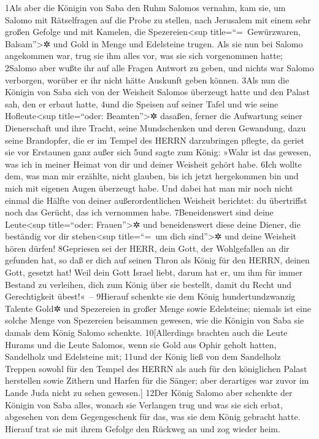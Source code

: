 1Als aber die Königin von Saba den Ruhm Salomos vernahm, kam sie, um
Salomo mit Rätselfragen auf die Probe zu stellen, nach Jerusalem mit
einem sehr großen Gefolge und mit Kamelen, die Spezereien\textless sup
title=``=~Gewürzwaren, Balsam''\textgreater✲ und Gold in Menge und
Edelsteine trugen. Als sie nun bei Salomo angekommen war, trug sie ihm
alles vor, was sie sich vorgenommen hatte; 2Salomo aber wußte ihr auf
alle Fragen Antwort zu geben, und nichts war Salomo verborgen, worüber
er ihr nicht hätte Auskunft geben können. 3Als nun die Königin von Saba
sich von der Weisheit Salomos überzeugt hatte und den Palast sah, den er
erbaut hatte, 4und die Speisen auf seiner Tafel und wie seine
Hofleute\textless sup title=``oder: Beamten''\textgreater✲ dasaßen,
ferner die Aufwartung seiner Dienerschaft und ihre Tracht, seine
Mundschenken und deren Gewandung, dazu seine Brandopfer, die er im
Tempel des HERRN darzubringen pflegte, da geriet sie vor Erstaunen ganz
außer sich 5und sagte zum König: »Wahr ist das gewesen, was ich in
meiner Heimat von dir und deiner Weisheit gehört habe. 6Ich wollte dem,
was man mir erzählte, nicht glauben, bis ich jetzt hergekommen bin und
mich mit eigenen Augen überzeugt habe. Und dabei hat man mir noch nicht
einmal die Hälfte von deiner außerordentlichen Weisheit berichtet: du
übertriffst noch das Gerücht, das ich vernommen habe. 7Beneidenswert
sind deine Leute\textless sup title=``oder: Frauen''\textgreater✲ und
beneidenswert diese deine Diener, die beständig vor dir
stehen\textless sup title=``=~um dich sind''\textgreater✲ und deine
Weisheit hören dürfen! 8Gepriesen sei der HERR, dein Gott, der
Wohlgefallen an dir gefunden hat, so daß er dich auf seinen Thron als
König für den HERRN, deinen Gott, gesetzt hat! Weil dein Gott Israel
liebt, darum hat er, um ihm für immer Bestand zu verleihen, dich zum
König über sie bestellt, damit du Recht und Gerechtigkeit übest!«~--
9Hierauf schenkte sie dem König hundertundzwanzig Talente Gold✲ und
Spezereien in großer Menge sowie Edelsteine; niemals ist eine solche
Menge von Spezereien beisammen gewesen, wie die Königin von Saba sie
damals dem König Salomo schenkte. 10{[}Allerdings brachten auch die
Leute Hurams und die Leute Salomos, wenn sie Gold aus Ophir geholt
hatten, Sandelholz und Edelsteine mit; 11und der König ließ von dem
Sandelholz Treppen sowohl für den Tempel des HERRN als auch für den
königlichen Palast herstellen sowie Zithern und Harfen für die Sänger;
aber derartiges war zuvor im Lande Juda nicht zu sehen gewesen.{]} 12Der
König Salomo aber schenkte der Königin von Saba alles, wonach sie
Verlangen trug und was sie sich erbat, abgesehen von dem Gegengeschenk
für das, was sie dem König gebracht hatte. Hierauf trat sie mit ihrem
Gefolge den Rückweg an und zog wieder heim.

